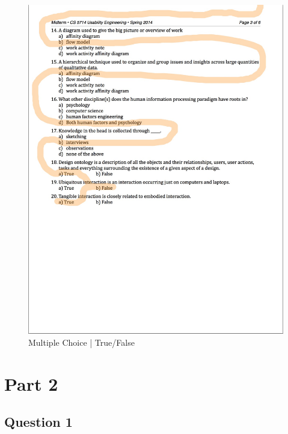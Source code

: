 \documentclass[11pt]{article}
\begin{document}
  \begin{figure}[H]
  \centering
  \includegraphics[height=0.9\linewidth]{img/two.jpg}
  \caption{Multiple Choice | True/False}
  \label{fig:two}
  \end{figure}


\section*{Part 2} %
  \subsection*{Question 1} 

\end{document}
